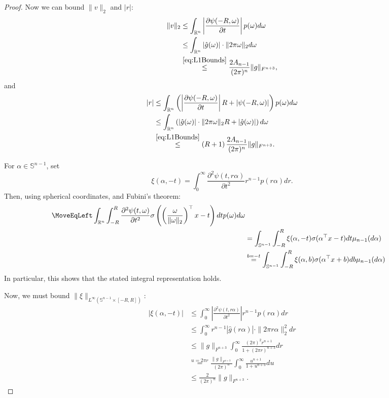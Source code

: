 \documentclass[twoside]{article}
\theoremstyle{definition}
\newcommand{\R}{\mathbb{R}}
\renewcommand{\S}{\mathbb{S}}
\newcommand{\1}[1]{\scalebox{1.25}{$\mathds{1}$}\left[#1\right]}
\begin{document}
\begin{proof}
Now we can bound $\|v\|_2$ and $|r|$:
\begin{align*}
\|v\|_2&\le\int_{\R^n}\left| \frac{\partial\psi(-R,\omega)}{\partial t}\right| p(\omega)d\omega \\
&\le \int_{\R^n}|\hat g(\omega)|\cdot \|2\pi \omega\|_2 d\omega \\
&\overset{\eqref{eq:L1Bounds}}{\le} \frac{2 A_{n-1}}{(2\pi)^{n}}\|g\|_{F^{n+3}},
\end{align*}
and
\begin{align*}
|r|&\le \int_{\R^n}
\left(\left|\frac{\partial \psi(-R,\omega)}{\partial t}\right|R+|\psi(-R,\omega)| \right)p(\omega)d\omega\\
&\le \int_{\R^n}
\left(|\hat g(\omega)|\cdot \|2\pi\omega\|_2 R + |\hat g(\omega)|\right)d\omega \\
&\overset{\eqref{eq:L1Bounds}}{\le} \left(R+1\right)\frac{2 A_{n-1}}{(2\pi)^n}\|g\|_{F^{n+3}}. 
\end{align*}

For $\alpha \in \S^{n-1}$, set 
$$
\xi(\alpha,-t)=\int_{0}^\infty \frac{\partial^2 \psi(t,r\alpha) }{\partial t^2}r^{n-1}p(r\alpha) dr.
$$
Then, using spherical coordinates, and Fubini's theorem:
\begin{align*}
\MoveEqLeft
\int_{\R^n}\int_{-R}^R\frac{\partial^2\psi(t,\omega)}{\partial t^2}\sigma\left(
\left(\frac{\omega}{\|\omega\|_2}\right)^\top x-t
\right)dt p(\omega) d\omega \\
&=
\int_{\S^{n-1}}\int_{-R}^R\xi(\alpha,-t)\sigma(\alpha^\top x-t)dt \mu_{n-1}(d\alpha)\\
&\overset{b=-t}{=}\int_{\S^{n-1}}\int_{-R}^R\xi(\alpha,b)\sigma(\alpha^\top x+b)db \mu_{n-1}(d\alpha)\\
\end{align*}
In particular, this shows that the stated integral representation holds.

Now, we must bound $\|\xi\|_{L^{\infty}(\S^{n-1}\times [-R,R])}$:
\begin{align*}
|\xi(\alpha,-t)|&\le 
\int_0^{\infty}\left|\frac{\partial^2 \psi(t,r\alpha) }{\partial t^2}\right|r^{n-1}p(r\alpha) dr \\
&\le \int_0^{\infty}r^{n-1}|\hat g(r\alpha)|\cdot \|2\pi r\alpha\|_2^2 dr\\
&\le \|g\|_{F^{n+3}}\int_0^{\infty}\frac{(2\pi)^2 r^{n+1}}{1+(2\pi r)^{n+3}}dr\\
&\overset{u=2\pi r}{=}\frac{\|g\|_{F^{n+3}}}{(2\pi )^n}\int_0^{\infty}\frac{u^{n+1}}{1+u^{n+3}}du \\
&\le \frac{2}{(2\pi)^n}\|g\|_{F^{n+3}}.
\end{align*}
\end{proof}
\end{document}

